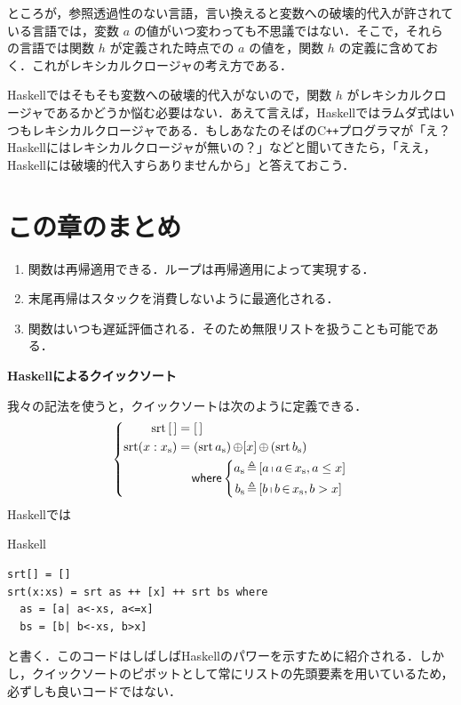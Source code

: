 \documentclass[a5paper,twoside,fleqn,draft]{jsbook}
\newcommand{\programminglanguage}[1]{\textsf{#1}}
\newcommand{\cxx}{\programminglanguage{C}\texttt{++}}
\newcommand{\haskell}{\programminglanguage{Haskell}}
\newenvironment{note}[1]{\begin{boxnote}\begin{center}\textbf{#1}\end{center}}{\end{boxnote}}
\newenvironment{haskellcode}{\begin{itembox}[r]{\haskell}}{\end{itembox}}
\newcommand{\mKeyword}[1]{\mathsf{#1}}
\newcommand{\mWhereKeyword}{\mKeyword{where}}
\DeclareMathOperator{\mWhere}{\mWhereKeyword}
\newcommand{\mEmptyList}{{[\,]}}
\newcommand{\mSpecialFunc}[1]{\mathrm{#1}}
\DeclareMathOperator{\mSort}{\mSpecialFunc{srt}}
\DeclareMathOperator{\mAppend}{\oplus}
\DeclareMathOperator{\mFrom}{\in}
\DeclareMathOperator{\mLetEq}{\triangleq}
\newcommand{\mList}[1]{{#1}_\mathrm{s}}
\DeclareMathOperator{\mListComp}{\shortmid}
\begin{document}
ところが，参照透過性のない言語，言い換えると変数への破壊的代入が許されている言語では，変数 $a$ の値がいつ変わっても不思議ではない．そこで，それらの言語では関数 $h$ が定義された時点での $a$ の値を，関数 $h$ の定義に含めておく．これがレキシカルクロージャの考え方である．

\haskell ではそもそも変数への破壊的代入がないので，関数 $h$ がレキシカルクロージャであるかどうか悩む必要はない．あえて言えば，\haskell ではラムダ式はいつもレキシカルクロージャである．もしあなたのそばの\cxx プログラマが「え？\haskell にはレキシカルクロージャが無いの？」などと聞いてきたら，「ええ，\haskell には破壊的代入すらありませんから」と答えておこう．

\section{この章のまとめ}

\begin{enumerate}
\item 関数は再帰適用できる．ループは再帰適用によって実現する．
\item 末尾再帰はスタックを消費しないように最適化される．
\item 関数はいつも遅延評価される．そのため無限リストを扱うことも可能である．
\end{enumerate}

\begin{note}{\haskell によるクイックソート}
我々の記法を使うと，クイックソートは次のように定義できる．
\begin{equation*}
  \left\{
  \begin{aligned}
    \mSort\mEmptyList
    &=\mEmptyList\\
    \mSort(x:\mList{x})
    &=(\mSort\mList{a})\mAppend[x]\mAppend{}(\mSort\mList{b})\\
    &\quad\mWhere\left\{\begin{aligned}
    \mList{a}&\mLetEq{}[a\mListComp a\mFrom\mList{x},a\le x]\\
    \mList{b}&\mLetEq{}[b\mListComp b\mFrom\mList{x},b>x]
    \end{aligned}
    \right.
  \end{aligned}
  \right.
\end{equation*}
\haskell では %
\begin{haskellcode}
\begin{verbatim}
srt[] = []
srt(x:xs) = srt as ++ [x] ++ srt bs where
  as = [a| a<-xs, a<=x]
  bs = [b| b<-xs, b>x]
\end{verbatim}
\end{haskellcode}
と書く．このコードはしばしば\haskell のパワーを示すために紹介される．しかし，クイックソートのピボットとして常にリストの先頭要素を用いているため，必ずしも良いコードではない．
\end{note}
\end{document}
